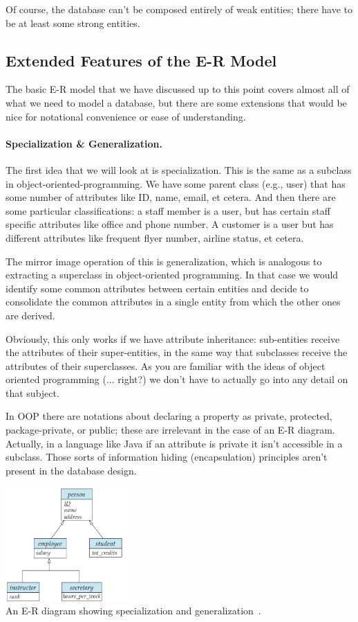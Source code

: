 Of course, the database can't be composed entirely of weak entities; there have to be at least some strong entities. 

\subsection*{Extended Features of the E-R Model}
The basic E-R model that we have discussed up to this point covers almost all of what we need to model a database, but there are some extensions that would be nice for notational convenience or ease of understanding.

\paragraph{Specialization \& Generalization.} The first idea that we will look at is specialization. This is the same as a subclass in object-oriented-programming. We have some parent class (e.g., user) that has some number of attributes like ID, name, email, et cetera. And then there are some particular classifications: a staff member is a user, but has certain staff specific attributes like office and phone number. A customer is a user but has different attributes like frequent flyer number, airline status, et cetera. 

The mirror image operation of this is generalization, which is analogous to extracting a superclass in object-oriented programming. In that case we would identify some common attributes between certain entities and decide to consolidate the common attributes in a single entity from which the other ones are derived.

Obviously, this only works if we have attribute inheritance: sub-entities receive the attributes of their super-entities, in the same way that subclasses receive the attributes of their superclasses. As you are familiar with the ideas of object oriented programming (... right?) we don't have to actually go into any detail on that subject. 

In OOP there are notations about declaring a property as private, protected, package-private, or public; these are irrelevant in the case of an E-R diagram. Actually, in a language like Java if an attribute is private it isn't accessible in a subclass. Those sorts of information hiding (encapsulation) principles aren't present in the database design.

\begin{center}
\includegraphics[width=0.35\textwidth]{images/specialization-generalization}\\
An E-R diagram showing specialization and generalization~\cite{dsc}.
\end{center}

